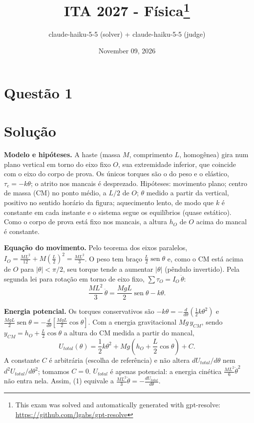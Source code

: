 \documentclass{article}%
\title{ITA 2027 - Física\thanks{This exam was solved and automatically generated with gpt-resolve: \url{https://github.com/lgabs/gpt-resolve}}}%
\author{claude{-}haiku{-}5{-}5 (solver) + claude{-}haiku{-}5{-}5 (judge)}%
\date{November 09, 2026}%
\begin{document}
%
\normalsize%
\maketitle%
\section*{Questão 1}

\section*{Solução}

\textbf{Modelo e hipóteses.} A haste (massa $M$, comprimento $L$, homogênea) gira num plano vertical em torno do eixo fixo $O$, sua extremidade inferior, que coincide com o eixo do corpo de prova. Os únicos torques são o do peso e o elástico, $\tau_e=-k\theta$; o atrito nos mancais é desprezado. Hipóteses: movimento plano; centro de massa (CM) no ponto médio, a $L/2$ de $O$; $\theta$ medido a partir da vertical, positivo no sentido horário da figura; aquecimento lento, de modo que $k$ é constante em cada instante e o sistema segue os equilíbrios (quase estático). Como o corpo de prova está fixo nos mancais, a altura $h_O$ de $O$ acima do mancal é constante.

\textbf{Equação do movimento.} Pelo teorema dos eixos paralelos, $I_O=\frac{ML^2}{12}+M\left(\frac{L}{2}\right)^2=\frac{ML^2}{3}$. O peso tem braço $\frac{L}{2}\operatorname{sen}\theta$ e, como o CM está acima de $O$ para $|\theta|<\pi/2$, seu torque tende a aumentar $|\theta|$ (pêndulo invertido). Pela segunda lei para rotação em torno de eixo fixo, $\sum\tau_O=I_O\,\ddot\theta$:
\[
\frac{ML^2}{3}\,\ddot{\theta}=\frac{MgL}{2}\operatorname{sen}\theta-k\theta. \tag{1}
\]

\textbf{Energia potencial.} Os torques conservativos são $-k\theta=-\frac{d}{d\theta}\left(\frac{1}{2}k\theta^2\right)$ e $\frac{MgL}{2}\operatorname{sen}\theta=-\frac{d}{d\theta}\left[\frac{MgL}{2}\cos\theta\right]$. Com a energia gravitacional $Mg\,y_{CM}$, sendo $y_{CM}=h_O+\frac{L}{2}\cos\theta$ a altura do CM medida a partir do mancal,
\[
U_{total}(\theta)=\frac{1}{2}k\theta^2+Mg\left(h_O+\frac{L}{2}\cos\theta\right)+C.
\]
A constante $C$ é arbitrária (escolha de referência) e não altera $dU_{total}/d\theta$ nem $d^2U_{total}/d\theta^2$; tomamos $C=0$. $U_{total}$ é apenas potencial: a energia cinética $\frac{ML^2}{6}\dot\theta^2$ não entra nela. Assim, (1) equivale a $\frac{ML^2}{3}\ddot\theta=-\frac{dU_{total}}{d\theta}$.
\end{document}

